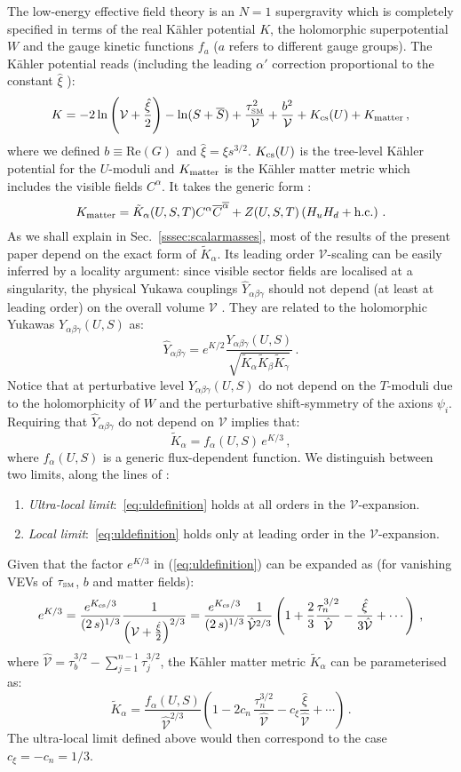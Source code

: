 \documentclass[11pt,a4paper]{article}
\newcommand{\ben}{\begin{enumerate}}
\newcommand{\een}{\end{enumerate}}
\newcommand{\be}{\begin{equation}}
\newcommand{\ee}{\end{equation}}
\def\SM{{\scriptscriptstyle \rm SM}}
\newcommand\vo{{\mathcal{V}}}
\begin{document}
The low-energy effective field theory is an $N=1$ supergravity which is completely specified in terms of the real K\"ahler potential $K$, the holomorphic superpotential $W$ and the gauge kinetic functions $f_a$ ($a$ refers to different gauge groups). The K\"ahler potential reads (including the leading $\alpha'$ correction proportional to the constant $\hat\xi$ \cite{BBHL}):
\be
\label{eq:kahlerpotential}
K = - 2 \ln \left(\vo + \frac{\hat\xi}{2}\right) - \ln (S + \overline{S}) + \frac{\tau_\SM^2}{\vo} + \frac{b^2}{\vo} + K_{\rm cs}(U) + K_{\rm matter} \,,
\ee
where we defined $b \equiv \text{Re}(G)$ and $\hat\xi = \xi s^{3/2}$. $K_{\rm cs}(U)$ is the tree-level K\"ahler potential for the $U$-moduli and $K_{\rm matter}$ is the K\"ahler matter metric which includes the visible fields $C^\alpha$. It takes the generic form \cite{Blumenhagen:2009gk,Aparicio:2014wxa}:
\be
\label{eq:kahlermattermetric1}
K_{\rm matter} = \tilde{K}_\alpha(U,S,T) C^\alpha \overline{C}^{\overline{\alpha}} + Z(U,S,T) \left(H_u H_d + \text{h.c.}\right) \,.
\ee
As we shall explain in Sec.~\ref{sssec:scalarmasses}, most of the results of the present paper depend on the exact form of $\tilde{K}_\alpha$. Its leading order $\vo$-scaling can be easily inferred by a locality argument: since visible sector fields are localised at a singularity, the physical Yukawa couplings $\hat{Y}_{\alpha \beta \gamma}$ should not depend (at least at leading order) on the overall volume $\vo$ \cite{Conlon:2006tj}. They are related to the holomorphic Yukawas $Y_{\alpha \beta \gamma}(U,S)$ as:
\be
\hat{Y}_{\alpha \beta \gamma} = e^{K/2} \frac{Y_{\alpha \beta \gamma}(U,S)}{\sqrt{\tilde{K}_\alpha \tilde{K}_\beta \tilde{K}_\gamma}} \,.
\ee
Notice that at perturbative level $Y_{\alpha \beta \gamma}(U,S)$ do not depend on the $T$-moduli due to the holomorphicity of $W$ and the perturbative shift-symmetry of the axions $\psi_i$. Requiring that $\hat{Y}_{\alpha \beta \gamma}$ do not depend on $\vo$ implies that:
\be
\tilde{K}_\alpha = f_\alpha(U,S)\, e^{K/3} \,,
\label{eq:uldefinition}
\ee
where $f_\alpha(U,S)$ is a generic flux-dependent function. We distinguish between two limits, along the lines of \cite{Aparicio:2014wxa}:
\ben
\item \textit{Ultra-local limit}:~\eqref{eq:uldefinition} holds at all orders in the $\vo$-expansion.

\item \textit{Local limit}:~\eqref{eq:uldefinition} holds only at leading order in the $\vo$-expansion.
\een
Given that the factor $e^{K/3}$ in (\ref{eq:uldefinition}) can be expanded as (for vanishing VEVs of $\tau_\SM$, $b$ and matter fields):
\be
e^{K/3}  = \frac{e^{K_{\rm cs}/3}}{(2\,s)^{1/3}}\frac{1}{\left(\vo + \frac{\hat\xi}{2}\right)^{2/3}} = 
\frac{e^{K_{\rm cs}/3}}{(2\,s)^{1/3}}\frac{1}{\hat\vo^{2/3}}\left(1+\frac 23 \frac{\tau_n^{3/2}}{\hat\vo} -\frac{\hat\xi}{3\hat\vo}+ \cdots\right)\,,
\ee
where $\hat\vo = \tau_b^{3/2} - \sum_{j=1}^{n-1}\tau_j^{3/2}$, the K\"ahler matter metric $\tilde{K}_\alpha$ can be parameterised as:
\be
\tilde{K}_\alpha = \frac{f_\alpha(U,S)}{\hat\vo^{2/3}}\left(1- 2 c_n \,\frac{\tau_n^{3/2}}{\hat\vo} -c_\xi \frac{\hat\xi}{\hat\vo}+ \cdots\right)\,.
\ee
The ultra-local limit defined above would then correspond to the case $c_\xi = - c_n = 1/3$.
\end{document}
